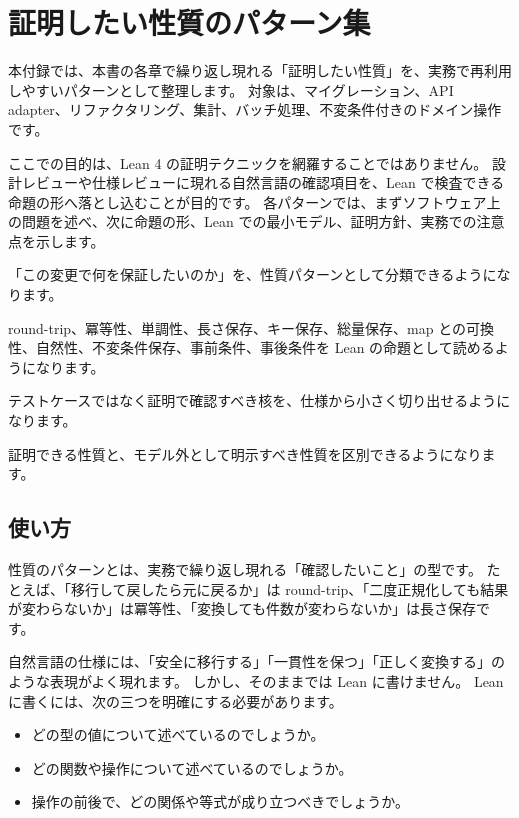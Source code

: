 \chapter{証明したい性質のパターン集}
\label{app:proof-property-patterns}

\begin{chapterabstract}
本付録では、本書の各章で繰り返し現れる「証明したい性質」を、実務で再利用しやすいパターンとして整理します。
対象は、マイグレーション、API adapter、リファクタリング、集計、バッチ処理、不変条件付きのドメイン操作です。

ここでの目的は、Lean 4 の証明テクニックを網羅することではありません。
設計レビューや仕様レビューに現れる自然言語の確認項目を、Lean で検査できる命題の形へ落とし込むことが目的です。
各パターンでは、まずソフトウェア上の問題を述べ、次に命題の形、Lean での最小モデル、証明方針、実務での注意点を示します。
\end{chapterabstract}

\begin{learninggoals}
\item 「この変更で何を保証したいのか」を、性質パターンとして分類できるようになります。
\item round-trip、冪等性、単調性、長さ保存、キー保存、総量保存、map との可換性、自然性、不変条件保存、事前条件、事後条件を Lean の命題として読めるようになります。
\item テストケースではなく証明で確認すべき核を、仕様から小さく切り出せるようになります。
\item 証明できる性質と、モデル外として明示すべき性質を区別できるようになります。
\end{learninggoals}

\section{使い方}

性質のパターンとは、実務で繰り返し現れる「確認したいこと」の型です。
たとえば、「移行して戻したら元に戻るか」は round-trip、「二度正規化しても結果が変わらないか」は冪等性、「変換しても件数が変わらないか」は長さ保存です。

自然言語の仕様には、「安全に移行する」「一貫性を保つ」「正しく変換する」のような表現がよく現れます。
しかし、そのままでは Lean に書けません。
Lean に書くには、次の三つを明確にする必要があります。

\begin{itemize}
\item どの型の値について述べているのでしょうか。
\item どの関数や操作について述べているのでしょうか。
\item 操作の前後で、どの関係や等式が成り立つべきでしょうか。
\end{itemize}

